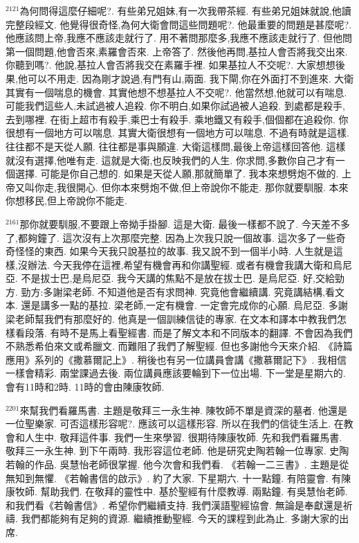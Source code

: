 \documentclass{book}
\begin{document}
$^{2121}$為何問得這麼仔細呢?.
有些弟兄姐妹,有一次我帶茶經.
有些弟兄姐妹就說,他讀完整段經文.
他覺得很奇怪,為何大衛會問這些問題呢?.
他最重要的問題是甚麼呢?.
他應該問上帝,我應不應該走就行了.
用不著問那麼多,我應不應該走就行了.
但他問第一個問題,他會否來,素羅會否來.
上帝答了.
然後他再問,基拉人會否將我交出來.
你聽到嗎?.
他說,基拉人會否將我交在素羅手裡.
如果基拉人不交呢?.
大家想想後果,他可以不用走.
因為剛才說過,有門有山,兩面.
我下閘,你在外面打不到進來.
大衛其實有一個喘息的機會.
其實他想不想基拉人不交呢?.
他當然想,他就可以有喘息.
可能我們這些人,未試過被人追殺.
你不明白,如果你試過被人追殺.
到處都是殺手,去到哪裡.
在街上超市有殺手,乘巴士有殺手.
乘地鐵又有殺手,個個都在追殺你.
你很想有一個地方可以喘息.
其實大衛很想有一個地方可以喘息.
不過有時就是這樣.
往往都不是天從人願.
往往都是事與願違.
大衛這樣問,最後上帝這樣回答他.
這樣就沒有選擇,他唯有走.
這就是大衛,也反映我們的人生.
你求問,多數你自己才有一個選擇.
可能是你自己想的.
如果是天從人願,那就簡單了.
我本來想劈炮不做的.
上帝又叫你走,我很開心.
但你本來劈炮不做,但上帝說你不能走.
那你就要馴服.
本來你想移民,但上帝說你不能走.

$^{2161}$那你就要馴服,不要跟上帝拗手掛腳.
這是大衛.
最後一樣都不說了.
今天差不多了,都夠鐘了.
這次沒有上次那麼完整.
因為上次我只說一個故事.
這次多了一些奇奇怪怪的東西.
如果今天我只說基拉的故事.
我又說不到一個半小時.
人生就是這樣,沒辦法.
今天我停在這裡,希望有機會再和你講聖經.
或者有機會我講大衛和烏尼亞.
不是拔士巴,是烏尼亞.
我今天講的焦點不是放在拔士巴.
是烏尼亞.
好,交給勁方.
勁方:多謝梁老師.
不知道他是否有求問神.
究竟他會繼續講.
究竟講結構,看文本.
還是講多一點的基拉.
梁老師,一定有機會.
一定會完成你的心願.
烏尼亞.
多謝梁老師幫我們有那麼好的.
他真是一個訓練信徒的專家.
在文本和譯本中教我們怎樣看段落.
有時不是馬上看聖經書.
而是了解文本和不同版本的翻譯.
不會因為我們不熟悉希伯來文或希臘文.
而難阻了我們了解聖經.
但也多謝他今天來介紹.
《詩篇應用》系列的《撒慕爾記上》.
稍後也有另一位講員會講《撒慕爾記下》.
我相信一樣會精彩.
兩堂課過去後.
兩位講員應該要輪到下一位出場.
下一堂是星期六的.
會有11時和2時.
11時的會由陳康牧師.

$^{2201}$來幫我們看羅馬書.
主題是敬拜三一永生神.
陳牧師不單是資深的墓者.
他還是一位聖樂家.
可否這樣形容呢?.
應該可以這樣形容.
所以在我們的信徒生活上.
在教會和人生中.
敬拜這件事.
我們一生來學習.
很期待陳康牧師.
先和我們看羅馬書.
敬拜三一永生神.
到下午兩時.
我形容這位老師.
他是研究史陶若翰一位專家.
史陶若翰的作品.
吳慧怡老師很掌握.
他今次會和我們看.
《若翰一二三書》.
主題是從無知到無懼.
《若翰書信的啟示》.
約了大家.
下星期六.
十一點鐘.
有陪靈會.
有陳康牧師.
幫助我們.
在敬拜的靈性中.
基於聖經有什麼教導.
兩點鐘.
有吳慧怡老師.
和我們看《若翰書信》.
希望你們繼續支持.
我們漢語聖經協會.
無論是奉獻還是祈禱.
我們都能夠有足夠的資源.
繼續推動聖經.
今天的課程到此為止.
多謝大家的出席.
\end{document}
